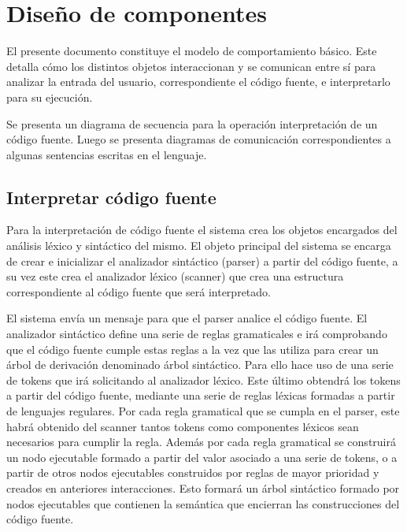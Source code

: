 \section{Diseño de componentes}
El presente documento constituye el modelo de comportamiento básico.
Este detalla cómo los distintos objetos interaccionan y se comunican entre sí para
analizar la entrada del usuario, correspondiente el código fuente, e interpretarlo
para su ejecución.

Se presenta un diagrama de secuencia para la operación interpretación
de un código fuente. Luego se presenta diagramas de comunicación correspondientes
a algunas sentencias escritas en el lenguaje.


\subsection{Interpretar código fuente}
Para la interpretación de código fuente el sistema crea los objetos 
encargados del análisis léxico y sintáctico del mismo. El objeto principal
del sistema se encarga de crear e inicializar el analizador sintáctico (parser) a
partir del código fuente, a su vez este crea el analizador léxico (scanner)
que crea una estructura correspondiente al código fuente que será interpretado.

El sistema envía un mensaje para que el parser analice el código fuente.
El analizador sintáctico define una serie de reglas gramaticales e irá comprobando que 
el código fuente cumple estas reglas a la vez que las utiliza para crear un árbol de derivación 
denominado árbol sintáctico. Para ello hace uso de una serie de tokens que irá solicitando 
al analizador léxico. Este último obtendrá los tokens a partir del código fuente, mediante 
una serie de reglas léxicas formadas a partir de lenguajes regulares. Por cada regla 
gramatical que se cumpla en el parser, este habrá obtenido del scanner tantos tokens como 
componentes léxicos sean necesarios para cumplir la regla. Además por cada regla gramatical se
construirá un nodo ejecutable formado a partir del valor asociado a una serie de tokens, o 
a partir de otros nodos ejecutables construidos por reglas de mayor prioridad y creados en 
anteriores interacciones. Esto formará un árbol sintáctico formado por nodos ejecutables que 
contienen la semántica que encierran las construcciones del código fuente.

